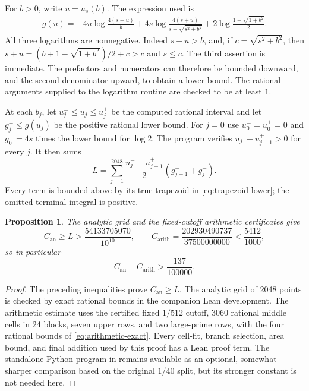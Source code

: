 \documentclass[11pt,letterpaper]{article}
\newtheorem{proposition}[proposition]{Proposition}
\theoremstyle{definition}
\newcommand{\arith}{\mathrm{arith}}
\newcommand{\an}{\mathrm{an}}
\begin{document}
For $b>0$, write $u=u_s(b)$. The expression used is
\begin{align}
 g(u)={}&4u\log\frac{4(s+u)}b
  +4s\log\frac{4(s+u)}{s+\sqrt{s^2+b^2}}
  +2\log\frac{1+\sqrt{1+b^2}}2.\label{eq:g-positive}
\end{align}
All three logarithms are nonnegative. Indeed $s+u>b$, and, if
$c=\sqrt{s^2+b^2}$, then
$s+u=(b+1-\sqrt{1+b^2})/2+c>c$ and $s\le c$.
The third assertion is immediate.
The prefactors and numerators can therefore be bounded downward, and
the second denominator upward, to obtain a lower bound.
The rational arguments supplied to the logarithm routine are checked
to be at least $1$.

At each $b_j$, let $u_j^-\le u_j\le u_j^+$ be the computed rational
interval and let $g_j^-\le g(u_j)$ be the positive rational lower bound.
For $j=0$ use $u_0^-=u_0^+=0$ and
$g_0^-=4s$ times the lower bound for $\log2$.
The program verifies $u_j^--u_{j-1}^+>0$ for every $j$.
It then sums
\begin{equation}\label{eq:rational-trapezoids}
 L=\sum_{j=1}^{2048}
   \frac{u_j^- -u_{j-1}^+}{2}(g_{j-1}^-+g_j^-).
\end{equation}
Every term is bounded above by its true trapezoid in
\eqref{eq:trapezoid-lower}; the omitted terminal integral is positive.

\begin{proposition}\label{prop:exact-gap}
The analytic grid and the fixed-cutoff arithmetic certificates give
\[
 C_{\an}\ge L>\frac{54133705070}{10^{10}},
 \qquad C_{\arith}=\frac{202930490737}{37500000000}
 <\frac{5412}{1000},
\]
so in particular
\begin{equation}\label{eq:verified-gap}
 C_{\an}-C_{\arith}>\frac{137}{100000}.
\end{equation}
\end{proposition}
\begin{proof}
The preceding inequalities prove $C_{\an}\ge L$. The analytic grid
of 2048 points is checked by exact rational bounds in the companion
Lean development. The arithmetic estimate uses the certified fixed
$1/512$ cutoff, 3060 rational middle cells in 24 blocks, seven upper
rows, and two large-prime rows, with the four rational bounds
of \eqref{eq:arithmetic-exact}. Every cell-fit, branch selection,
area bound, and final addition used by this proof has a Lean proof term.
The standalone Python program in  remains
available as an optional, somewhat sharper comparison based on the
original $1/40$ split, but its stronger constant is not needed here.
\end{proof}
\end{document}
